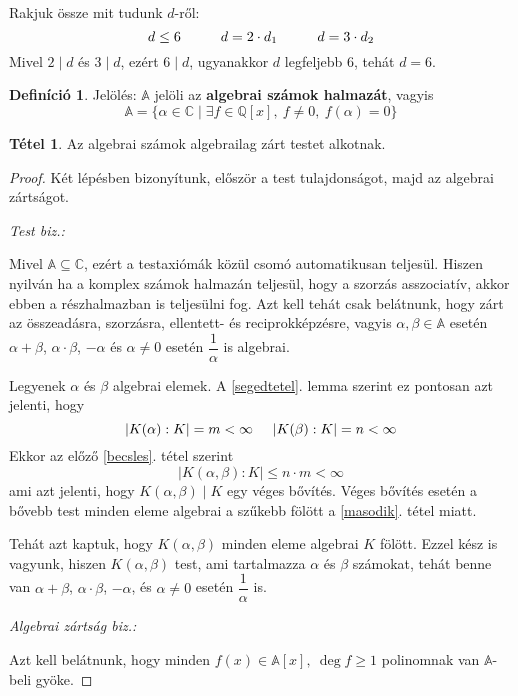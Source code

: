 \documentclass[12pt]{book}
\theoremstyle{plain} %
\theoremstyle{definition} %
\newtheorem{defi/}{Definíció}[section]
\newenvironment{defi}
  {\renewcommand{\qedsymbol}{$\clubsuit$}%
   \pushQED{\qed}\begin{defi/}}
  {\popQED\end{defi/}}
\newtheorem{theo/}{Tétel}[section]
\newenvironment{theo}
  {\renewcommand{\qedsymbol}{$\clubsuit$}%
   \pushQED{\qed}\begin{theo/}}
  {\popQED\end{theo/}}
\theoremstyle{remark}
\renewcommand\qedsymbol{$\blacksquare$}
\numberwithin{equation}{section}  %
\begin{document}
	Rakjuk össze mit tudunk $d$-ről:
	\[ d\leq 6 \hspace{10mm} d = 2\cdot d_1 \hspace{10mm} d = 3\cdot d_2 \]
	Mivel $2\mid d$ és $3\mid d$, ezért $6\mid d$, ugyanakkor $d$ legfeljebb $6$, tehát $d=6$.

	\begin{defi}
		Jelölés: $\mathbb{A}$ jelöli az \textbf{algebrai számok halmazát}, vagyis
		\[ \mathbb{A} = \{ \alpha \in \mathbb{C} \mid \exists f\in \mathbb{Q}[x],\ f\neq 0,\ f(\alpha) =0  \} \]
	\end{defi}
	
	
	\begin{theo}
		Az algebrai számok algebrailag zárt testet alkotnak.
	\end{theo}
	
	\begin{proof}
		Két lépésben bizonyítunk, először a test tulajdonságot, majd az algebrai zártságot.
		
		\textit{Test biz.:}
		
		Mivel $\mathbb{A}\subseteq \mathbb{C}$, ezért a testaxiómák közül csomó automatikusan teljesül. Hiszen nyilván ha a komplex számok halmazán teljesül, hogy a szorzás asszociatív, akkor ebben a részhalmazban is teljesülni fog. Azt kell tehát csak belátnunk, hogy zárt az összeadásra, szorzásra, ellentett- és reciprokképzésre, vagyis $\alpha,\beta \in \mathbb{A}$ esetén $\alpha+\beta$, $\alpha \cdot \beta$, $-\alpha$ és $\alpha\neq 0$ esetén $\dfrac{1}{\alpha}$ is algebrai. 
		
		Legyenek $\alpha$ és $\beta$ algebrai elemek. A \ref{segedtetel}. lemma szerint ez pontosan azt jelenti, hogy
		\[ |K(\alpha):K| = m < \infty \hspace{5mm} |K(\beta):K| = n < \infty  \]
		Ekkor az előző \ref{becsles}. tétel szerint
		\[ |K(\alpha,\beta):K| \leq n\cdot m < \infty \]
		ami azt jelenti, hogy $K(\alpha,\beta)\mid K$ egy véges bővítés. Véges bővítés esetén a bővebb test minden eleme algebrai a szűkebb fölött a \ref{masodik}. tétel miatt. 
		
		Tehát azt kaptuk, hogy $K(\alpha,\beta)$ minden eleme algebrai $K$ fölött. Ezzel kész is vagyunk, hiszen $K(\alpha,\beta)$ test, ami tartalmazza $\alpha$ és $\beta$ számokat, tehát benne van $\alpha+\beta$, $\alpha\cdot \beta$, $-\alpha$, és $\alpha \neq 0$ esetén $\dfrac{1}{\alpha}$ is.
		
		\textit{Algebrai zártság biz.:}
		
		Azt kell belátnunk, hogy minden $f(x)\in \mathbb{A}[x],\ \deg f \geq 1$ polinomnak van $\mathbb{A}$-beli gyöke.
		

\end{proof}
\end{document}
